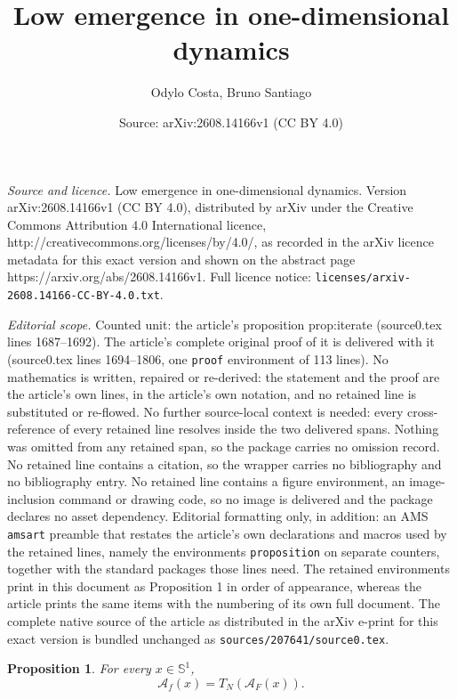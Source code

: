\documentclass[10pt,a4paper]{amsart}
\title{Low emergence in one-dimensional dynamics}
\author{Odylo Costa, Bruno Santiago}
\date{Source: arXiv:2608.14166v1 (CC BY 4.0)}
\newtheorem{proposition}{Proposition}
\newcommand{\Sone}{\mathbb{S}^1}
\newcommand{\cA}{{\mathcal A}}
\begin{document}
\maketitle

\noindent\emph{Source and licence.} Low emergence in one-dimensional dynamics. Version arXiv:2608.14166v1 (CC BY 4.0), distributed by arXiv under the Creative Commons Attribution 4.0 International licence, http://creativecommons.org/licenses/by/4.0/, as recorded in the arXiv licence metadata for this exact version and shown on the abstract page https://arxiv.org/abs/2608.14166v1. Full licence notice: \texttt{licenses/arxiv-2608.14166-CC-BY-4.0.txt}.\par\smallskip

\noindent\textit{Editorial scope.} Counted unit: the article's proposition prop:iterate (source0.tex lines 1687--1692). The article's complete original proof of it is delivered with it (source0.tex lines 1694--1806, one \texttt{proof} environment of 113 lines). No mathematics is written, repaired or re-derived: the statement and the proof are the article's own lines, in the article's own notation, and no retained line is substituted or re-flowed.  No further source-local context is needed: every cross-reference of every retained line resolves inside the two delivered spans.  Nothing was omitted from any retained span, so the package carries no omission record.  No retained line contains a citation, so the wrapper carries no bibliography and no bibliography entry.  No retained line contains a figure environment, an image-inclusion command or drawing code, so no image is delivered and the package declares no asset dependency.  Editorial formatting only, in addition: an AMS \texttt{amsart} preamble that restates the article's own declarations and macros used by the retained lines, namely the environments \texttt{proposition} on separate counters, together with the standard packages those lines need.  The retained environments print in this document as Proposition 1 in order of appearance, whereas the article prints the same items with the numbering of its own full document.  The complete native source of the article as distributed in the arXiv e-print for this exact version is bundled unchanged as \texttt{sources/207641/source0.tex}.
\begin{proposition}\label{prop:iterate}
For every \(x\in\Sone\),
\[
\cA_f(x)=T_N(\cA_F(x)).
\]
\end{proposition}
\end{document}
